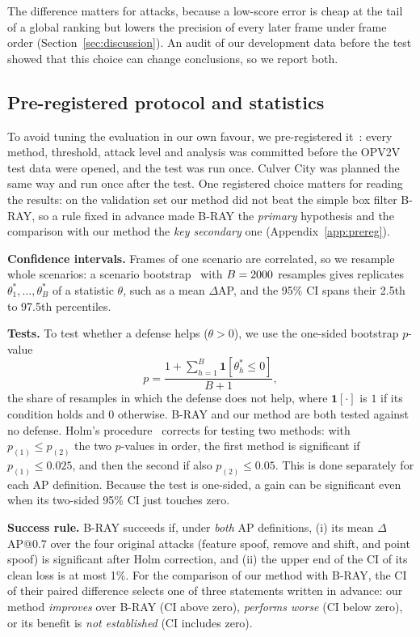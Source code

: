 \documentclass[conference]{IEEEtran}
\begin{document}
The difference matters for attacks, because a low-score error is cheap at the tail of a global ranking but
lowers the precision of every later frame under frame order (Section~\ref{sec:discussion}). An audit of our
development data before the test showed that this choice can change conclusions, so we report both.

\subsection{Pre-registered protocol and statistics}
\label{sec:protocol}
To avoid tuning the evaluation in our own favour, we pre-registered it~\cite{nosek2018preregistration}: every
method, threshold, attack level and analysis was committed before the OPV2V test data were opened, and the test
was run once. Culver City was planned the same way and run once after the test. One registered choice matters
for reading the results: on the validation set our method did not beat the simple box filter B-RAY, so a rule
fixed in advance made B-RAY the \emph{primary} hypothesis and the comparison with our method the \emph{key
secondary} one (Appendix~\ref{app:prereg}).

\textbf{Confidence intervals.} Frames of one scenario are correlated, so we resample whole scenarios: a scenario
bootstrap~\cite{efron1979bootstrap} with $B=2000$ resamples gives replicates $\theta^*_1,\dots,\theta^*_B$ of a
statistic $\theta$, such as a mean $\Delta$AP, and the 95\% CI spans their 2.5th to 97.5th percentiles.

\textbf{Tests.} To test whether a defense helps ($\theta>0$), we use the one-sided bootstrap $p$-value
\begin{equation}
p=\frac{1+\sum_{h=1}^{B}\mathbf{1}[\theta^*_h\le 0]}{B+1},
\label{eq:p}
\end{equation}
the share of resamples in which the defense does not help, where $\mathbf{1}[\cdot]$ is $1$ if its condition
holds and $0$ otherwise. B-RAY and our method are both tested against no defense. Holm's
procedure~\cite{holm1979} corrects for testing two methods: with $p_{(1)}\le p_{(2)}$ the two $p$-values in
order, the first method is significant if $p_{(1)}\le 0.025$, and then the second if also $p_{(2)}\le 0.05$. This
is done separately for each AP definition. Because the test is one-sided, a gain can be significant even when its
two-sided 95\% CI just touches zero.

\textbf{Success rule.} B-RAY succeeds if, under \emph{both} AP definitions, (i) its mean $\Delta$AP@0.7 over the
four original attacks (feature spoof, remove and shift, and point spoof) is significant after Holm correction,
and (ii) the upper end of the CI of its clean loss is at most 1\%. For the comparison of our method with B-RAY,
the CI of their paired difference selects one of three statements written in advance: our method
\emph{improves} over B-RAY (CI above zero), \emph{performs worse} (CI below zero), or its benefit is \emph{not
established} (CI includes zero).
\end{document}
